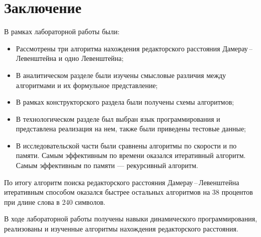 \chapter*{Заключение}

В рамках лабораторной работы были:

\begin{itemize}
	\item Рассмотрены три алгоритма нахождения редакторского расстояния Дамерау\,--\,Левенштейна и одно Левенштейна;
	\item В аналитическом разделе были изучены смысловые различия между алгоритмами и их формульное представление;
	\item В рамках конструкторского раздела были получены схемы алгоритмов;
	\item В технологическом разделе был выбран язык программирования и представлена реализация на нем, также были приведены тестовые данные;
	\item В исследовательской части были сравнены алгоритмы по скорости и по памяти. Самым эффективным по времени оказался итеративный алгоритм. Самым эффективным по памяти --- рекурсивный алгоритм. 
\end{itemize}

По итогу алгоритм поиска редакторского расстояния Дамерау\,--\,Левенштейна итеративным способом оказался быстрее остальных алгоритмов на 38 процентов при длине слова в 240 символов.
 
В ходе лабораторной работы получены навыки динамического программирования, реализованы и изученные алгоритмы нахождения редакторского расстояния.